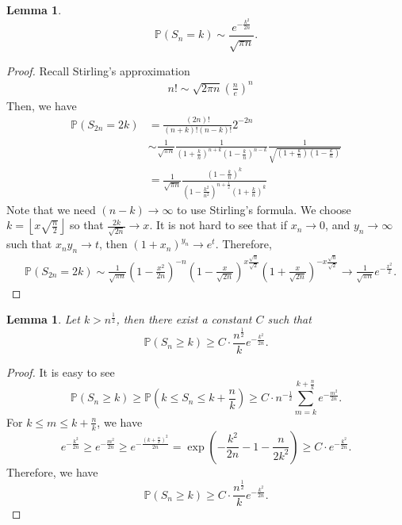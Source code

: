 \documentclass[11pt]{article}
\newtheorem{lemma}[theorem]{Lemma}
\theoremstyle{definition}
\newcommand{\floor}[1]{\left\lfloor #1 \right\rfloor}
\begin{document}
\begin{lemma}\label{2.6}
  $$\mathbb{P}(S_n=k)\sim \frac{e^{-\frac{k^2}{2n}}}{\sqrt{\pi n}}.$$
\end{lemma}
\begin{proof}
Recall Stirling's approximation
\begin{equation*}
  \begin{aligned}
     & n!\sim \sqrt{2\pi n}\left(\frac{n}{e}\right)^n
  \end{aligned}
\end{equation*}
Then, we have
  \begin{equation*}
    \begin{aligned}
      \mathbb{P}\left( S_{2n}=2k \right) &=\frac{(2n)!}{(n+k)!(n-k)!} 2^{-2n}\\
&\sim \frac{1}{\sqrt{\pi n}} \frac{1}{\left( 1+\frac{k}{n} \right)^{n+k}\left( 1-\frac{k}{n} \right)^{n-k}} \frac{1}{\sqrt{\left(1+\frac{k}{n} \right)\left(1-\frac{k}{n} \right)}}\\ 
&=\frac{1}{\sqrt{\pi n}} \frac{\left( 1-\frac{k}{n} \right)^k}{\left( 1-\frac{k^2}{n^2} \right)^{n+\frac{1}{2}} \left( 1+\frac{k}{n}\right)^k}
    \end{aligned}
  \end{equation*}
Note that we need $(n-k)\rightarrow \infty$ to use Stirling's formula. We choose $k=\floor{x\sqrt{\frac{n}{2}}}$ so that $\frac{2k}{\sqrt{2n}}\rightarrow x$.
It is not hard to see that if $x_n\rightarrow 0$, and $y_n\rightarrow \infty$ such that $x_n y_n\rightarrow t$, then $(1+x_n)^{y_n}\rightarrow e^t$. Therefore, 
\begin{equation*}
  \begin{aligned}
     & \mathbb{P}(S_{2n}=2k)\sim \frac{1}{\sqrt{\pi n}} \left( 1-\frac{x^2}{2n} \right)^{-n}\left(1-\frac{x}{\sqrt{2n}} \right)^{x\frac{\sqrt{n}}{\sqrt{2}}} \left(1+\frac{x}{\sqrt{2n}}  \right)^{-x\frac{\sqrt{n}}{\sqrt{2}}}\rightarrow \frac{1}{\sqrt{\pi n}} e^{-\frac{x^2}{2}}.
  \end{aligned}
\end{equation*}



\end{proof}
\begin{lemma}
  Let $k>n^\frac{1}{2}$, then there exist a constant $C$ such that 
\[
\mathbb{P}(S_n\ge k)\ge C\cdot \frac{n^\frac{1}{2}}{k}e^{-\frac{k^2}{2n}}.
\]
\end{lemma}
\begin{proof} It is easy to see
  \[
\mathbb{P}(S_n\ge k)\ge \mathbb{P}(k\le S_n\le k+\frac{n}{k})\ge C\cdot n^{-\frac{1}{2}}\sum^{k+\frac{n}{k}}_{m=k} e^{-\frac{m^2}{2n}}.
\]
For $k\le m\le k+\frac{n}{k}$, we have
\[
e^{-\frac{k^2}{2n}}\ge e^{-\frac{m^2}{2n}}\ge e^{-\frac{(k+\frac{n}{k})^2}{2n}}=\exp\left( -\frac{k^2}{2n}-1-\frac{n}{2k^2} \right)\ge C\cdot e^{-\frac{k^2}{2n}}.
\]
Therefore, we have
\[
\mathbb{P}(S_n\ge k)\ge C\cdot \frac{n^\frac{1}{2}}{k}e^{-\frac{k^2}{2n}}.
\]







\end{proof}
\end{document}
